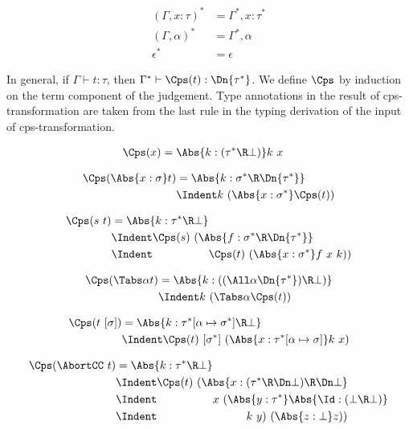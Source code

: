 \documentclass{amsart}
\begin{document}
\begin{align*}
(\Gamma, x:\tau)^* & =
  \Gamma^*, x:\tau^*
  \\
(\Gamma, \alpha)^* & =
  \Gamma^*, \alpha
  \\
\epsilon^* & =
  \epsilon
\end{align*}

In general, if $\Gamma \vdash t : \tau$, then
$\Gamma^* \vdash \Cps(t) : \Dn{\tau^*}$.
We define $\Cps$ by induction on the term component of the
judgement. Type annotations in the result of cps-transformation
are taken from the last rule in the typing derivation of the
input of cps-transformation.

\begin{align*}
\Cps(x)
& =
\Abs{k: (\tau^* \R \bot)} k~x
\end{align*}

\begin{align*}
\Cps(\Abs{x:\sigma}t)
& =
\Abs{k:\sigma^* \R \Dn{\tau^*}}
\\&\Indent
k~(\Abs{x:\sigma^*}\Cps(t))
\end{align*}

\begin{align*}
\Cps(s~t)
& =
\Abs{k:\tau^*\R\bot}
\\&\Indent
\Cps(s)~(\Abs{f:\sigma^* \R \Dn{\tau^*}}
\\&\Indent\hspace{5em}
\Cps(t)~(\Abs{x:\sigma^*}
f~x~k
))
\end{align*}

\begin{align*}
\Cps(\Tabs\alpha t)
& =
\Abs{k:((\All\alpha \Dn{\tau^*}) \R \bot)}
\\&\Indent
k~(\Tabs\alpha \Cps(t))
\end{align*}

\begin{align*}
\Cps(t~[\sigma])
& =
\Abs{k : \tau^*[\alpha\mapsto\sigma^*] \R \bot}
\\&\Indent
\Cps(t)~[\sigma^*]~(\Abs{x : \tau^*[\alpha\mapsto\sigma]} k~x)
\end{align*}

\begin{align*}
\Cps(\AbortCC~t)
& =
\Abs{k : \tau^*\R\bot}
\\&\Indent
\Cps(t)~(\Abs{x : (\tau^*\R\Dn\bot)\R\Dn\bot}
\\&\Indent\hspace{5em}
x~(\Abs{y : \tau^*} \Abs{\Id : (\bot\R\bot)}
\\&\Indent\hspace{8em}
k~y)~(\Abs{z : \bot}z))
\end{align*}
\end{document}
